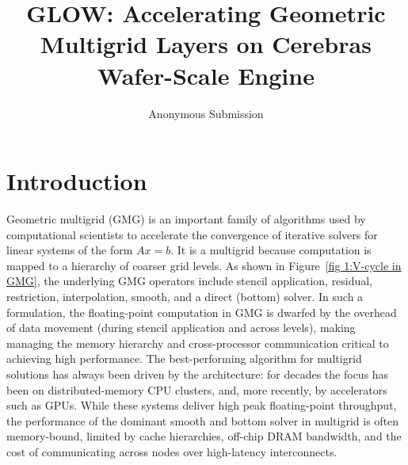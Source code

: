 \documentclass[sigconf]{acmart}
\title{GLOW: Accelerating Geometric Multigrid Layers on Cerebras Wafer-Scale Engine}
\author{Anonymous Submission}
\begin{document}
\maketitle

\section{Introduction}
Geometric multigrid (GMG) is an important family of algorithms used by computational scientists to accelerate the convergence of iterative solvers for linear systems of the form $Ax=b$.  It is a multigrid because computation is mapped to a hierarchy of coarser grid levels.  As shown in Figure~\ref{fig 1:V-cycle in GMG}, the underlying GMG operators include stencil application, residual, restriction, interpolation, smooth, and a direct (bottom) solver. In such a formulation, the floating-point computation in GMG is dwarfed by the overhead of data movement (during stencil application and across levels), making managing the memory hierarchy and cross-processor communication critical to achieving high performance.    
The best-performing algorithm for multigrid solutions has always been driven by the architecture: for decades the focus has been on 
distributed-memory CPU clusters, and, more recently, by accelerators such as GPUs. While these systems deliver high peak floating-point throughput, the performance of the dominant smooth and bottom solver in multigrid is often
memory-bound, limited by cache hierarchies, off-chip DRAM bandwidth, and the cost of communicating across nodes over high-latency interconnects. %
\end{document}
